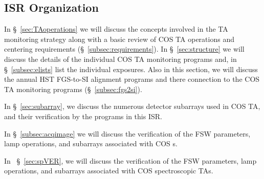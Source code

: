 \subsection{ISR Organization}\label{subsec:org}
In \S~\ref{sec:TAoperations} we will discuss the concepts involved
in the TA monitoring strategy along with a basic review of COS TA operations and
centering requirements (\S~\ref{subsec:requirements}).
In \S~\ref{sec:structure} we will discuss the details of the individual
COS TA monitoring programs and, in \S~\ref{subsec:elists} list the individual exposures.
Also in this section, we will discuss the annual HST FGS-to-SI alignment programs and there
connection to the COS TA monitoring programs (\S~\ref{subsec:fgs2si}).

In \S~\ref{sec:subarray}, we discuss the numerous detector subarrays used in COS TA, and their verification by the programs in this ISR.

In \S~\ref{subsec:acqimage} we will discuss the verification of the FSW parameters, lamp operations, and subarrays associated with COS s.

In ~\S~\ref{sec:spVER}, we will discuss the verification of the FSW parameters, lamp operations, and subarrays associated with COS spectroscopic TAs.

